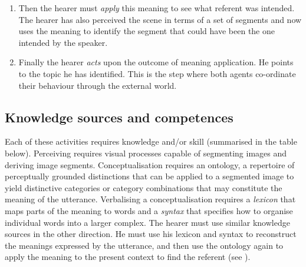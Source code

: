 \begin{enumerate}
\item Then the hearer must {\itshape apply} this meaning
to see what referent was intended. The hearer has
also perceived the scene in terms of a set of 
segments and now uses 
the meaning to identify the segment that
could have been the one intended by the speaker.

\item Finally the hearer {\itshape acts} upon the outcome of meaning
application. He points to the topic he has identified. This is the 
step where both agents co-ordinate their 
behaviour through the external world. 
\end{enumerate}

\subsection{Knowledge sources and competences}

Each of these activities requires knowledge and/or skill
(summarised in the table below). Perceiving requires 
visual processes capable of segmenting images and deriving image 
segments. Conceptualisation requires an ontology, 
a repertoire of perceptually grounded distinctions
that can be applied to a segmented image to yield 
distinctive categories or category combinations that 
may constitute the meaning of the utterance. Verbalising 
a conceptualisation requires 
a {\itshape lexicon} that maps parts of the meaning to words and 
a {\itshape syntax} that specifies how to organise individual words
into a larger complex. 
The hearer must use similar 
knowledge sources in the other direction. He must use 
his lexicon and syntax to reconstruct the meanings expressed
by the utterance, and then use the 
ontology again to apply the meaning to the present 
context to find the referent (see ). 


